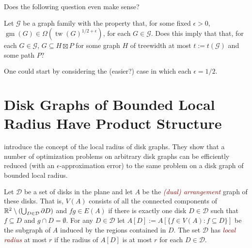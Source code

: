 \documentclass{patmorin}
\newcommand{\defin}[1]{\textcolor{Maroon}{\emph{#1}}}
\DeclareMathOperator{\tw}{tw}
\DeclareMathOperator{\gm}{gm}
\begin{document}
%
%
%




Does the following question even make sense?

\begin{op}
  Let $\mathcal{G}$ be a graph family with the property that, for some fixed $\epsilon >0$, $\gm(G)\in\Omega(\tw(G)^{1/2+\epsilon})$, for each $G\in\mathcal{G}$.  Does this imply that that, for each $G\in\mathcal{G}$, $G\subseteq H\boxtimes P$ for some graph $H$ of treewidth at most $t:=t(\mathcal{G})$ and some path $P$?
\end{op}

One could start by considering the (easier?) case in which each $\epsilon = 1/2$.


\newpage
\section{Disk Graphs of Bounded Local Radius Have Product Structure}

\citet{lokshtanov.panolan:framework} introduce the concept of the local radius of disk graphs.  They show that a number of optimization problems on arbitrary disk graphs can be efficiently reduced (with an $\epsilon$-approximation error) to the same problem on a disk graph of bounded local radius.

Let $\mathcal{D}$ be a set of disks in the plane and let $A$ be the \defin{(dual) arrangement} graph of these disks.  That is, $V(A)$ consists of all the connected components of $\mathbb{R}^2\setminus(\bigcup_{D\in\mathcal{D}}\partial D)$ and $fg\in E(A)$ if there is exactly one disk $D\in\mathcal{D}$ such that $f\subseteq D$ and $g\cap D=\emptyset$.  For any $D\in\mathcal{D}$ let $A[D]:=A[\{f\in V(A): f\subseteq D\}]$ be the subgraph of $A$ induced by the regions contained in $D$.  The set $\mathcal{D}$ has \defin{local radius} at most $r$ if the radius of $A[D]$ is at most $r$ for each $D\in\mathcal{D}$.
\end{document}
